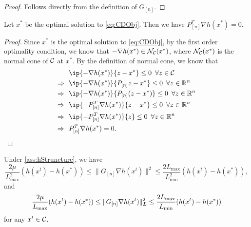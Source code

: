 \begin{proof}
    Follows directly from the definition of $G_{[n]}$. 
\end{proof}

\begin{lemma} \label{lemma:gradient_optimal}
    Let $x^*$ be the optimal solution to \eqref{eq:CDObj}. Then we have $P_{[n]}^T\nabla h(x^*) = 0$. 
\end{lemma}

\begin{proof}
    Since $x^*$ is the optimal solution to \eqref{eq:CDObj}, by the first order optimality condition, we know that $-\nabla h(x^*) \in \mathcal{N}_{\mathcal{C}}(x^*)$, where $\mathcal{N}_{\mathcal{C}}(x^*)$ is the normal cone of $\mathcal{C}$ at $x^*$. By the definition of normal cone, we know that 
    \begin{align*}
                    ~&~ \ip{-\nabla h(x^*)}{z - x^*} \leq 0 \enspace\forall z \in \Cscr \\
        \Rightarrow ~&~ \ip{-\nabla h(x^*)}{P_{[n]} z - x^*} \leq 0 \enspace\forall z \in \Real^n \\
        \Rightarrow ~&~ \ip{-\nabla h(x^*)}{P_{[n]} (z - x^*)} \leq 0 \enspace\forall z \in \Real^n \\
        \Rightarrow ~&~ \ip{-P_{[n]}^T \nabla h(x^*)}{z - x^*} \leq 0 \enspace\forall z \in \Real^n \\
        \Rightarrow ~&~ \ip{-P_{[n]}^T \nabla h(x^*)}{z} \leq 0 \enspace\forall z \in \Real^n \\
        \Rightarrow ~&~ P_{[n]}^T \nabla h(x^*) = 0.
    \end{align*}
\end{proof}

\begin{lemma} \label{lemma:GnormLowerAndUpperBound}
    Under \autoref{ass:hStruncture}, we have 
    \[\frac{2\mu}{L_{\max}^2}(h(x^t) - h(x^*)) \leq \|G_{[n]}\nabla h(x^t)\|^2 \leq \frac{2L_{\max}}{L_{\min}^2}(h(x^t) - h(x^*)),\]
    and
    \[\frac{2\mu}{L_{\max}}(h(x^t) - h(x^*)) \leq \|G_{[n]}\nabla h(x^t)\|_{\boldsymbol{L}}^2 \leq \frac{2L_{\max}}{L_{\min}}(h(x^t) - h(x^*))\]
    for any $x^t \in \mathcal{C}$.
\end{lemma}

